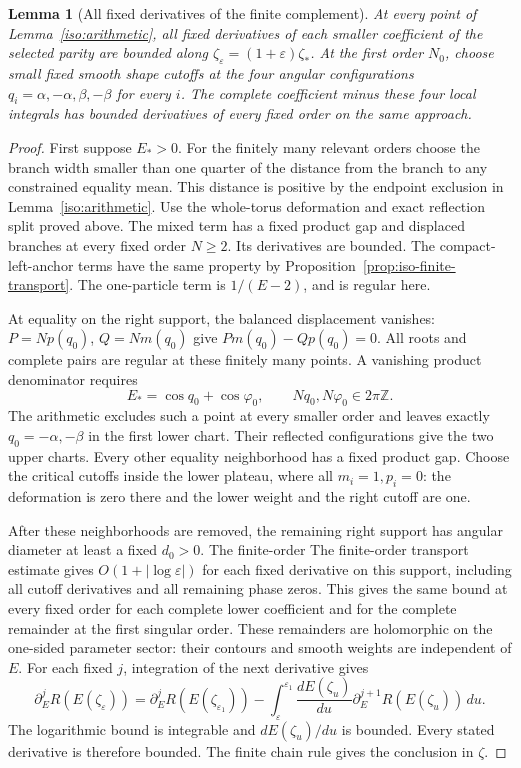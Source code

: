 \documentclass[11pt]{article}
\numberwithin{equation}{section}
\newtheorem{lemma}[theorem]{Lemma}
\theoremstyle{definition}
\newcommand{\Z}{\mathbb Z}
\newcommand{\eps}{\varepsilon}
\begin{document}
\begin{lemma}[All fixed derivatives of the finite complement]
\label{iso:fixed}
At every point of Lemma~\ref{iso:arithmetic}, all fixed derivatives
of each smaller coefficient of the selected parity are bounded along
$\zeta_\eps=(1+\eps)\zeta_*$. At the first order $N_0$, choose
small fixed smooth shape cutoffs at the four angular configurations
$q_i=\alpha,-\alpha,\beta,-\beta$ for every $i$. The complete
coefficient minus these four local integrals has bounded derivatives
of every fixed order on the same approach.
\end{lemma}
\begin{proof}
First suppose $E_*>0$. For the finitely many relevant orders choose
the branch width smaller than one quarter of the distance from the
branch to any constrained equality mean. This distance is positive
by the endpoint exclusion in Lemma~\ref{iso:arithmetic}.
Use the whole-torus deformation and exact reflection split proved
above. The mixed term has a fixed product gap and displaced branches
at every fixed order $N\ge2$. Its derivatives are bounded. The
compact-left-anchor terms have the same property by
Proposition~\ref{prop:iso-finite-transport}. The one-particle term is
$1/(E-2)$, and is regular here.

At equality on the right support, the balanced displacement vanishes:
$P=Np(q_0)$, $Q=Nm(q_0)$ give $Pm(q_0)-Qp(q_0)=0$.
All roots and complete pairs are regular at these finitely many
points. A vanishing product denominator requires
\[
 E_* =\cos q_0+\cos\varphi_0,\qquad
 Nq_0,N\varphi_0\in2\pi\Z.
\]
The arithmetic excludes such a point at every smaller order and
leaves exactly $q_0=-\alpha,-\beta$ in the first lower chart.
Their reflected configurations give the two upper charts.
Every other equality neighborhood has a fixed product gap.
Choose the critical cutoffs inside the lower plateau, where all
$m_i=1,p_i=0$: the deformation is zero there and the lower weight
and the right cutoff are one.

After these neighborhoods are removed, the remaining right support
has angular diameter at least a fixed $d_0>0$. The finite-order
The finite-order transport estimate gives $O(1+|\log\eps|)$ for
each fixed derivative on this support, including all cutoff
derivatives and all remaining phase zeros. This gives the same
bound at every fixed order for each complete lower coefficient
and for the complete remainder at the first singular order.
These remainders are holomorphic on the one-sided parameter sector:
their contours and smooth weights are independent of $E$.
For each fixed $j$, integration of the next derivative gives
\[
 \partial_E^j R(E(\zeta_\eps))
 =\partial_E^j R(E(\zeta_{\eps_1}))
  -\int_\eps^{\eps_1}\frac{d E(\zeta_u)}{du}
                  \partial_E^{j+1}R(E(\zeta_u))\,du.
\]
The logarithmic bound is integrable and $dE(\zeta_u)/du$ is bounded.
Every stated derivative is therefore bounded. The finite chain rule
gives the conclusion in $\zeta$.


\end{proof}
\end{document}
